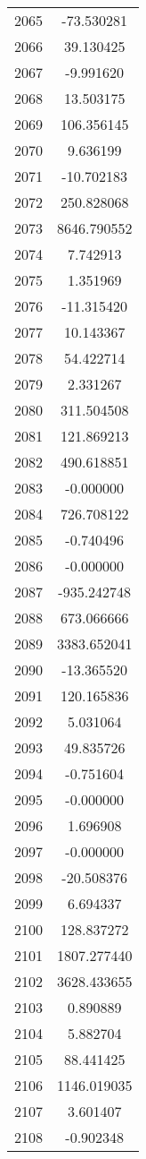 \documentclass[12pt]{article}
\begin{document}
\begin{longtable}{@{}cc@{}}
2065 & -73.530281 \\
2066 & 39.130425 \\
2067 & -9.991620 \\
2068 & 13.503175 \\
2069 & 106.356145 \\
2070 & 9.636199 \\
2071 & -10.702183 \\
2072 & 250.828068 \\
2073 & 8646.790552 \\
2074 & 7.742913 \\
2075 & 1.351969 \\
2076 & -11.315420 \\
2077 & 10.143367 \\
2078 & 54.422714 \\
2079 & 2.331267 \\
2080 & 311.504508 \\
2081 & 121.869213 \\
2082 & 490.618851 \\
2083 & -0.000000 \\
2084 & 726.708122 \\
2085 & -0.740496 \\
2086 & -0.000000 \\
2087 & -935.242748 \\
2088 & 673.066666 \\
2089 & 3383.652041 \\
2090 & -13.365520 \\
2091 & 120.165836 \\
2092 & 5.031064 \\
2093 & 49.835726 \\
2094 & -0.751604 \\
2095 & -0.000000 \\
2096 & 1.696908 \\
2097 & -0.000000 \\
2098 & -20.508376 \\
2099 & 6.694337 \\
2100 & 128.837272 \\
2101 & 1807.277440 \\
2102 & 3628.433655 \\
2103 & 0.890889 \\
2104 & 5.882704 \\
2105 & 88.441425 \\
2106 & 1146.019035 \\
2107 & 3.601407 \\
2108 & -0.902348 \\

\end{longtable}
\end{document}

